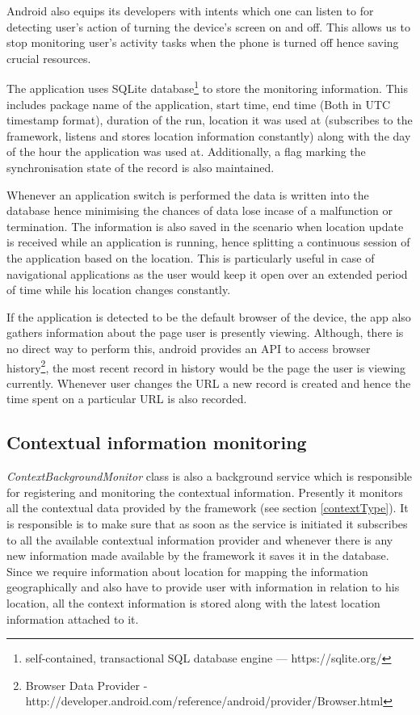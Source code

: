 \documentclass[12pt]{report}
\begin{document}
Android also equips its developers with intents which one can listen to for detecting user's action of turning the device's screen on and off. This allows us to stop monitoring user's activity tasks when the phone is turned off hence saving crucial resources.

The application uses SQLite database\footnote{ self-contained, transactional SQL database engine — https://sqlite.org/} to store the monitoring information. This includes package name of the application, start time, end time (Both in UTC timestamp format), duration of the run, location it was used at (subscribes to the framework, listens and stores location information constantly) along with the day of the hour the application was used at. Additionally, a flag marking the synchronisation state of the record is also maintained. 

Whenever an application switch is performed the data is written into the database hence minimising the chances of data lose incase of a malfunction or termination. The information is also saved in the scenario when location update is received while an application is running, hence splitting a continuous session of the application based on the location. This is particularly useful in case of navigational applications as the user would keep it open over an extended period of time while his location changes constantly.

If the application is detected to be the default browser of the device, the app also gathers information about the page user is presently viewing. Although, there is no direct way to perform this, android provides an API to access browser history\footnote{Browser Data Provider - http://developer.android.com/reference/android/provider/Browser.html}, the most recent record in history would be the page the user is viewing currently. Whenever user changes the URL a new record is created and hence the time spent on a particular URL is also recorded.

\subsection{Contextual information monitoring}
\textit{ContextBackgroundMonitor} class is also a background service which is responsible for registering and monitoring the contextual information. Presently it monitors all the contextual data provided by the framework (see section \ref{contextType}). It is responsible is to make sure that as soon as the service is initiated it subscribes to all the available contextual information provider and whenever there is any new information made available by the framework it saves it in the database. Since we require information about location for mapping the information geographically and also have to provide user with information in relation to his location, all the context information is stored along with the latest location information attached to it.
\end{document}
